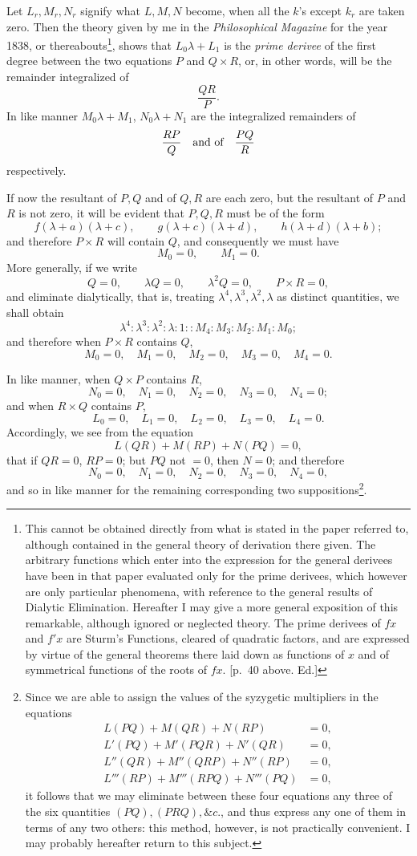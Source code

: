 \documentclass[11pt]{article}
\newcommand{\sourcepage}[1]{\marginpar{\scriptsize p.~#1}}
\begin{document}
Let $L_r,M_r,N_r$ signify what $L,M,N$ become, when all the $k$'s except $k_r$ are taken zero. Then the theory given by me in the \emph{Philosophical Magazine} for the year 1838, or thereabouts\footnote{This cannot be obtained directly from what is stated in the paper referred to, although contained in the general theory of derivation there given. The arbitrary functions which enter into the expression for the general derivees have been in that paper evaluated only for the prime derivees, which however are only particular phenomena, with reference to the general results of Dialytic Elimination. Hereafter I may give a more general exposition of this remarkable, although ignored or neglected theory. The prime derivees of $fx$ and $f'x$ are Sturm's Functions, cleared of quadratic factors, and are expressed by virtue of the general theorems there laid down as functions of $x$ and of symmetrical functions of the roots of $fx$. [p.~40 above. Ed.]}, shows that $L_0\lambda+L_1$ is the \emph{prime derivee} of the first degree between the two equations $P$ and $Q\times R$, or, in other words, will be the remainder integralized of
\[
\frac{QR}{P}.
\]
In like manner $M_0\lambda+M_1$, $N_0\lambda+N_1$ are the integralized remainders of
\[
\frac{RP}{Q}\quad\hbox{and of}\quad \frac{PQ}{R}
\]
respectively.

If now the resultant of $P,Q$ and of $Q,R$ are each zero, but the resultant of $P$ and $R$ is not zero, it will be evident that $P,Q,R$ must be of the form
\[
f(\lambda+a)(\lambda+c),\qquad
g(\lambda+c)(\lambda+d),\qquad
h(\lambda+d)(\lambda+b);
\]
and therefore $P\times R$ will contain $Q$, and consequently we must have
\[
M_0=0,\qquad M_1=0.
\]
More generally, if we write
\[
Q=0,\qquad
\lambda Q=0,\qquad
\lambda^2 Q=0,\qquad
P\times R=0,
\]
and eliminate dialytically, that is, treating $\lambda^4,\lambda^3,\lambda^2,\lambda$ as distinct quantities, we shall obtain
\[
\lambda^4:\lambda^3:\lambda^2:\lambda:1::M_4:M_3:M_2:M_1:M_0;
\]
and therefore when $P\times R$ contains $Q$,
\[
M_0=0,\quad M_1=0,\quad M_2=0,\quad M_3=0,\quad M_4=0.
\]

\sourcepage{134}
In like manner, when $Q\times P$ contains $R$,
\[
N_0=0,\quad N_1=0,\quad N_2=0,\quad N_3=0,\quad N_4=0;
\]
and when $R\times Q$ contains $P$,
\[
L_0=0,\quad L_1=0,\quad L_2=0,\quad L_3=0,\quad L_4=0.
\]
Accordingly, we see from the equation
\[
L(QR)+M(RP)+N(PQ)=0,
\]
that if $QR=0$, $RP=0$; but $PQ$ not $=0$, then $N=0$; and therefore
\[
N_0=0,\quad N_1=0,\quad N_2=0,\quad N_3=0,\quad N_4=0,
\]
and so in like manner for the remaining corresponding two suppositions\footnote{Since we are able to assign the values of the syzygetic multipliers in the equations
\[
\begin{aligned}
L(PQ)+M(QR)+N(RP)&=0,\\
L'(PQ)+M'(PQR)+N'(QR)&=0,\\
L''(QR)+M''(QRP)+N''(RP)&=0,\\
L'''(RP)+M'''(RPQ)+N'''(PQ)&=0,
\end{aligned}
\]
it follows that we may eliminate between these four equations any three of the six quantities $(PQ),(PRQ),\&c.$, and thus express any one of them in terms of any two others: this method, however, is not practically convenient. I may probably hereafter return to this subject.}.
\end{document}
